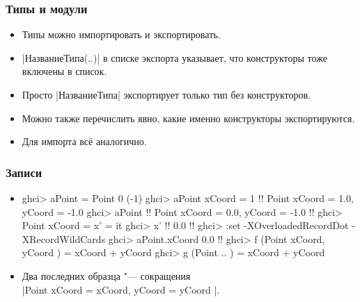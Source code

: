 \documentclass[10pt]{beamer}
\begin{document}
\begin{frame}[fragile]
  \frametitle{Типы и модули}
  \begin{itemize}
    \item Типы можно импортировать и экспортировать.
    \item \haskinline|НазваниеТипа(..)| в списке экспорта указывает, что конструкторы тоже включены в список.
    \item Просто \haskinline|НазваниеТипа| экспортирует только тип без конструкторов.
    \item Можно также перечислить явно, какие именно конструкторы экспортируются.
    \item Для импорта всё аналогично.
  \end{itemize}
\end{frame}

\begin{frame}[fragile]
  \frametitle{Записи}\hypertarget{rec2}{}
  \hyperlink{rec1}{}
  \begin{itemize}
    \item
          \begin{haskellsmall}
            ghci> aPoint = Point 0 (-1)
            ghci> aPoint { xCoord = 1 } !\pause!
            Point {xCoord = 1.0, yCoord = -1.0}
            ghci> aPoint !\pause!
            Point {xCoord = 0.0, yCoord = -1.0} !\pause!
            ghci> Point {xCoord = x'} = it
            ghci> x' !\pause!
            0.0 !\pause!
            ghci> :set -XOverloadedRecordDot -XRecordWildCards
            ghci> aPoint.xCoord
            0.0 !\pause!
            ghci> f (Point { xCoord, yCoord }) = xCoord + yCoord
            ghci> g (Point { .. }) = xCoord + yCoord
          \end{haskellsmall}
    \item Два последних образца "--- сокращения\\ \haskinline|Point { xCoord = xCoord, yCoord = yCoord }|.
  \end{itemize}
\end{frame}
\end{document}

